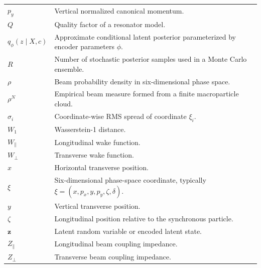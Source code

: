 \begin{longtable}{@{}p{}@{}p{}@{}}
\(p_y\) & Vertical normalized canonical momentum.\\
\(Q\) & Quality factor of a resonator model.\\
\(q_\phi(z\mid X,c)\) & Approximate conditional latent posterior parameterized by encoder parameters \(\phi .\)\\
\(R\) & Number of stochastic posterior samples used in a Monte Carlo ensemble.\\
\(\rho\) & Beam probability density in six-dimensional phase space.\\
\(\rho^N\) & Empirical beam measure formed from a finite macroparticle cloud.\\
\(\sigma_i\) & Coordinate-wise RMS spread of coordinate \(\xi_{i} .\)\\
\(W_1\) & Wasserstein-1 distance.\\
\(W_\parallel\) & Longitudinal wake function.\\
\(W_\perp\) & Transverse wake function.\\
\(x\) & Horizontal transverse position.\\
\(\xi\) & Six-dimensional phase-space coordinate, typically \(\xi = ( x , p_{x} , y , p_{y} , \zeta , \delta ) .\)\\
\(y\) & Vertical transverse position.\\
\(\zeta\) & Longitudinal position relative to the synchronous particle.\\
\(\mathbf z\) & Latent random variable or encoded latent state.\\
\(Z_\parallel\) & Longitudinal beam coupling impedance.\\
\(Z_\perp\) & Transverse beam coupling impedance.\\
\end{longtable}
\endgroup

